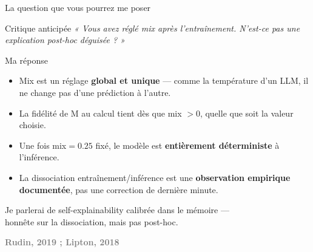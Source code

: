 \documentclass[10pt]{beamer}
\newcommand{\source}[1]{\vspace{4pt}\hfill{\textcolor{gray}{\textbf{\tiny #1}}}}
\begin{document}
\begin{frame}{La question que vous pourrez me poser}
  \begin{block}{Critique anticipée}
    \footnotesize
    \emph{« Vous avez réglé mix après l'entraînement. N'est-ce pas une explication post-hoc déguisée ? »}
  \end{block}

  \begin{exampleblock}{Ma réponse}
    \footnotesize
    \begin{itemize}
      \item Mix est un réglage \textbf{global et unique} --- comme la température d'un LLM, il ne change pas d'une prédiction à l'autre.
      \item La fidélité de M au calcul tient dès que mix $> 0$, quelle que soit la valeur choisie.
      \item Une fois mix$=0.25$ fixé, le modèle est \textbf{entièrement déterministe} à l'inférence.
      \item La dissociation entraînement/inférence est une \textbf{observation empirique documentée}, pas une correction de dernière minute.
    \end{itemize}
  \end{exampleblock}

  \begin{verdictbox}
    \centering\footnotesize
    Je parlerai de \alert{self-explainability calibrée} dans le mémoire ---\\
    honnête sur la dissociation, mais pas post-hoc.
  \end{verdictbox}

  \source{Rudin, 2019 ; Lipton, 2018}
\end{frame}
\end{document}
